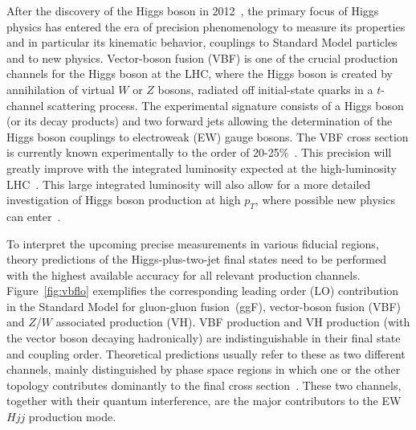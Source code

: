 \documentclass[10pt,prd,fleqn,superscriptaddress,notitlepage,nofootinbib,preprintnumbers,nobalancelastpage]{revtex4-1}
\newcommand{\VBF}{VBF\xspace}
\newcommand{\VH}{VH\xspace}
\begin{document}
After the discovery of the Higgs boson in 2012~\cite{Aad:2012tfa,Chatrchyan:2012ufa}, the primary focus of Higgs physics has entered the era of precision phenomenology to measure its properties and in particular its kinematic behavior, couplings to Standard Model particles and to new physics. 
Vector-boson fusion (\VBF) is one of the crucial production channels for the Higgs boson at the LHC, where the Higgs boson is created by annihilation of virtual $W$ or $Z$ bosons, radiated off initial-state quarks in a $t$-channel scattering process. 
The experimental signature consists of a Higgs boson (or its decay products) and two forward jets allowing the determination of the Higgs boson couplings to electroweak (EW) gauge bosons. The \VBF cross section is currently known experimentally to the order of 20-25\%~\cite{ATLAS-CONF-2020-027,Sirunyan:2021ybb}.
This precision will greatly improve with the integrated luminosity expected at the high-luminosity LHC~\cite{HL-HE-LHC}. 
This large integrated luminosity will also allow for a more detailed investigation of Higgs boson production at high $p_T$, where possible new physics can enter~\cite{Greljo:2015sla,Araz:2020zyh}.

To interpret the upcoming precise measurements in various fiducial regions, theory predictions of the Higgs-plus-two-jet final states need to be performed with the highest available accuracy for all relevant production channels. 
Figure~\ref{fig:vbflo} exemplifies the corresponding leading order (LO) contribution in the Standard Model for gluon-gluon fusion~(ggF), vector-boson fusion (\VBF) and $Z$/$W$ associated production (\VH). 
\VBF production and \VH production (with the vector boson decaying hadronically) are indistinguishable in their final state and coupling order. 
Theoretical predictions usually refer to these as two different channels, mainly distinguished by phase space regions in which one or the other topology contributes dominantly to the final cross section~\cite{Ciccolini:2007jr,Ciccolini:2007ec,Campanario:2018ppz}. 
These two channels, together with their quantum interference, are the major contributors to the EW $Hjj$ production mode.
\end{document}
